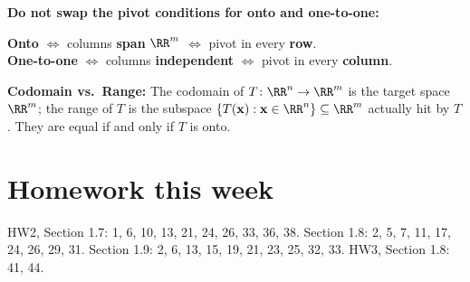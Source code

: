 \documentclass[10pt]{scrartcl}
\newcommand{\vv}[1]{\mathbf{#1}}
\begin{document}
\begin{trapbox}
  \ii \textbf{Do not swap the pivot conditions for onto and one-to-one:}
  \begin{center}
    \textbf{Onto} $\iff$ columns \textbf{span} $\RR^m$ $\iff$ pivot in every \textbf{row}. \\
    \textbf{One-to-one} $\iff$ columns \textbf{independent} $\iff$ pivot in every \textbf{column}.
  \end{center}
  \ii \textbf{Codomain vs.\ Range:} The codomain of $T\colon\RR^n\to\RR^m$ is the target space $\RR^m$; the range of $T$ is the subspace $\{T(\vv x):\vv x\in\RR^n\}\subseteq\RR^m$ actually hit by $T$. They are equal if and only if $T$ is onto.
\end{trapbox}

\section{Homework this week}
HW2, Section 1.7: 1, 6, 10, 13, 21, 24, 26, 33, 36, 38. Section 1.8: 2, 5, 7, 11, 17, 24, 26, 29, 31. Section 1.9: 2, 6, 13, 15, 19, 21, 23, 25, 32, 33. HW3, Section 1.8: 41, 44.
\end{document}
